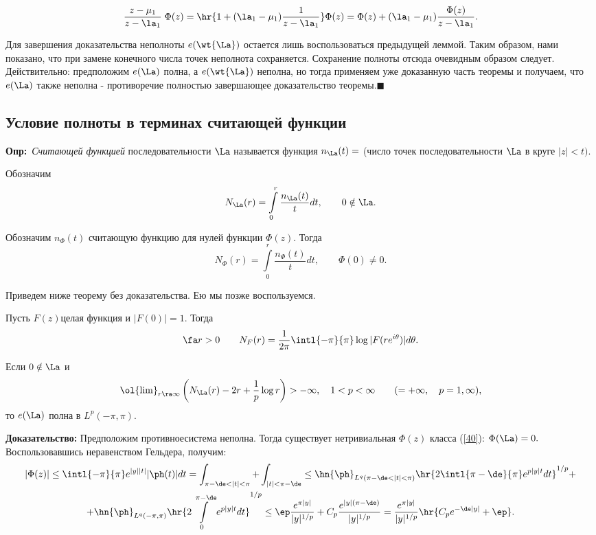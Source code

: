 \documentclass[a4paper]{article}
\def\defin{\noindent\textbf{Опр:}\ }
\begin{document}
$$\frac{z-\mu_1}{z-\la_1}\;\Phi(z)=\hr{1+(\la_1-\mu_1)\frac1{z-\la_1}}\Phi(z)=\Phi(z)+(\la_1-\mu_1)\frac{\Phi(z)}{z-\la_1}.$$

Для завершения доказательства неполноты $e(\wt{\La})$
остается лишь воспользоваться предыдущей леммой. Таким образом,
нами показано, что при замене конечного числа точек неполнота
сохраняется. Сохранение полноты отсюда очевидным образом следует.
Действительно: предположим $e(\La)$ полна, а
$e(\wt{\La})$ неполна, но тогда применяем уже
доказанную часть теоремы и получаем, что $e(\La)$ также
неполна - противоречие полностью завершающее доказательство
теоремы.$\blacksquare$

\subsection{Условие полноты в терминах считающей функции}

\begin{wrapfigure}[10]{l}{162pt}
\end{wrapfigure}

\defin \emph{Считающей функцией} последовательности
$\La$ называется функция $n_{\La}(t)=$ (число точек
последовательности $\La$ в круге $|z|<t).$

Обозначим
$$N_{\La}(r)=\int\limits_0^r\frac{n_{\La}(t)}{t}dt,\qquad0\notin\La.$$

Обозначим $n_{\Phi}(t)$ считающую функцию для нулей функции
$\Phi(z).$ Тогда
$$N_{\Phi}(r)=\int\limits_0^r\frac{n_{\Phi}(t)}{t}dt,\qquad \Phi(0)\neq0.$$

Приведем ниже теорему без доказательства. Ею мы позже
воспользуемся.
\begin{theorems}
Пусть $F(z)$\т целая функция и $|F(0)|=1.$ Тогда
$$\fa r>0\qquad N_F(r)=\frac1{2\pi}\intl{-\pi}{\pi}\log|F(re^{i\theta})|d\theta.$$
\end{theorems}



\begin{theorems}\label{50}
Если $0\notin\La$ и
$$\ol{\lim}_{r\ra\infty}\left(N_{\La}(r)-2r+\frac1p \log
r\right)>-\infty,\quad 1<p<\infty\qquad(=+\infty,\quad
p=1,\infty),$$ то $e(\La)$ полна в $L^p(-\pi,\pi).$
\end{theorems}
\textbf{Доказательство:} Предположим противное\т система неполна.
Тогда существует нетривиальная $\Phi(z)$ класса (\ref{40}):
$\Phi(\La)=0.$ Воспользовавшись неравенством Гельдера,
получим:
\begin{multline*}
|\Phi(z)|\le\intl{-\pi}{\pi}e^{|y| |t|}|\ph(t)|dt=\int_{\pi-\de<|t|<\pi}+\int_{|t|<\pi-\de}
\le\hn{\ph}_{L^q(\pi-\de<|t|<\pi)}\hr{2\intl{\pi-\de}{\pi}e^{p|y|t}dt}^{1/p}+\\
+\hn{\ph}_{L^q(-\pi,\pi)}\hr{2\int\limits_0^{\pi-\de}e^{p|y|t}dt}^{1/p}\le\ep\frac{e^{\pi|y|}}{|y|^{1/p}}+
C_p\frac{e^{|y|(\pi-\de)}}{|y|^{1/p}}
=\frac{e^{\pi|y|}}{|y|^{1/p}}\hr{C_pe^{-\de|y|}+\ep}.
\end{multline*}
\end{document}
